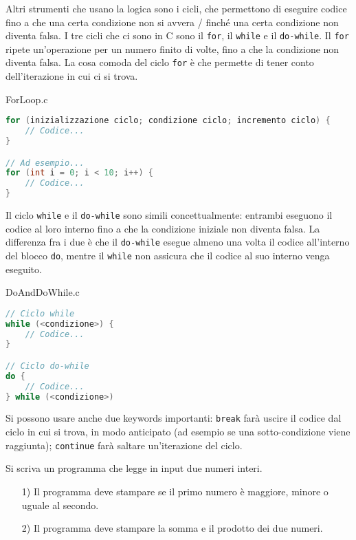 Altri strumenti che usano la logica sono i cicli, che permettono di eseguire codice fino a che una certa condizione non si avvera / finché una certa condizione non diventa falsa. I tre cicli che ci sono in C sono il \verb|for|, il \verb|while| e il \verb|do-while|.
\nwl
Il \verb|for| ripete un'operazione per un numero finito di volte, fino a che la condizione non diventa falsa. La cosa comoda del ciclo \verb|for| è che permette di tener conto dell'iterazione in cui ci si trova.

\begin{codeblock}{ForLoop.c}
    \begin{lstlisting}[language = c]
for (inizializzazione ciclo; condizione ciclo; incremento ciclo) {
    // Codice...
}

// Ad esempio...
for (int i = 0; i < 10; i++) {
    // Codice...
}\end{lstlisting}
\end{codeblock}

Il ciclo \verb|while| e il \verb|do-while| sono simili concettualmente: entrambi eseguono il codice al loro interno fino a che la condizione iniziale non diventa falsa. La differenza fra i due è che il \verb|do-while| esegue almeno una volta il codice all'interno del blocco \verb|do|, mentre il \verb|while| non assicura che il codice al suo interno venga eseguito.

\begin{codeblock}{DoAndDoWhile.c}
    \begin{lstlisting}[language = c]
// Ciclo while
while (<condizione>) {
    // Codice...
}

// Ciclo do-while
do {
    // Codice...
} while (<condizione>)\end{lstlisting}
\end{codeblock}

Si possono usare anche due keywords importanti: \verb|break| farà uscire il codice dal ciclo in cui si trova, in modo anticipato (ad esempio se una sotto-condizione viene raggiunta); \verb|continue| farà saltare un'iterazione del ciclo.

\begin{exercise}
    Si scriva un programma che legge in input due numeri interi.
    \begin{itemize}
        \item [1)] Il programma deve stampare se il primo numero è maggiore, minore o uguale al secondo.
        \item [2)] Il programma deve stampare la somma e il prodotto dei due numeri.
    \end{itemize}
\end{exercise}

